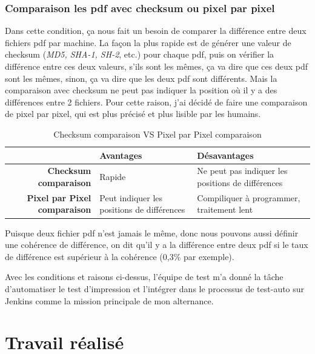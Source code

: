     \subsubsection{Comparaison les pdf avec checksum ou pixel par pixel}
    \par Dans cette condition, ça nous fait un besoin de comparer la différence entre deux fichiers pdf par machine. La façon la plus rapide est de générer une valeur de checksum (\textit{MD5, SHA-1, SH-2}, etc.) pour chaque pdf, puis on vérifier la différence entre ces deux valeurs, s'ils sont les mêmes, ça va dire que ces deux pdf sont les mêmes, sinon, ça va dire que les deux pdf sont différents. Mais la comparaison avec checksum ne peut pas indiquer la position où il y a des différences entre 2 fichiers. Pour cette raison, j'ai décidé de faire une comparaison de pixel par pixel, qui est plus précisé et plus lisible par les humains. 
    
    \begin{table}[H]
        \centering
        \begin{tabular}{|r|m{4cm}|m{4cm}|}
            \hline
            &   \Large{\textbf{Avantages}} & \Large{\textbf{Désavantages}}\\
            \hline
            \textbf{Checksum comparaison} & Rapide & Ne peut pas indiquer les positions de différences  \\
            \hline
             \textbf{Pixel par Pixel comparaison} & Peut indiquer les positions de différences  & Compiliquer à programmer, traitement lent \\
             \hline
        \end{tabular}
        \caption{Checksum comparaison VS Pixel par Pixel comparaison}
        \label{tab:pixel_vs_checksum_label}
    \end{table}
    \par Puisque deux fichier pdf n'est jamais le même, donc nous pouvons aussi définir une cohérence de différence, on dit qu'il y a la différence entre deux pdf si le taux de différence est supérieur à la cohérence (0,3\% par exemple).
    
    \par Avec les conditions et raisons ci-dessus, l'équipe de test m'a donné la tâche d'automatiser le test d'impression et l'intégrer dans le processus de test-auto sur Jenkins comme la mission principale de mon alternance.

\newpage
\section{Travail réalisé}
